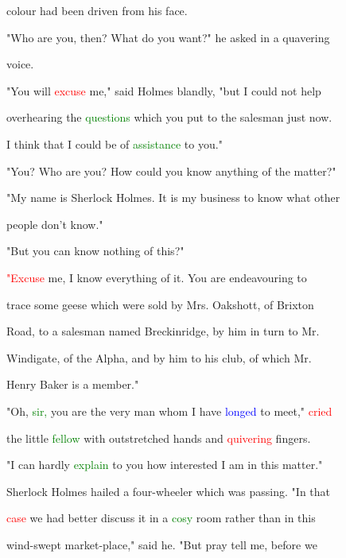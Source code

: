  colour had been driven from his face.



 "Who are you, then? What do you want?" he asked in a quavering

 voice.



 "You will \textcolor{red}{excuse} me," said Holmes blandly, "but I could not help

 overhearing the \textcolor{green}{questions} which you put to the salesman just now.

 I think that I could be of \textcolor{green}{assistance} to you."



 "You? Who are you? How could you know anything of the matter?"



 "My name is Sherlock Holmes. It is my business to know what other

 people don't know."



 "But you can know nothing of this?"



 \textcolor{red}{"Excuse} me, I know everything of it. You are endeavouring to

 trace some geese which were sold by Mrs. Oakshott, of Brixton

 Road, to a salesman named Breckinridge, by him in turn to Mr.

 Windigate, of the Alpha, and by him to his club, of which Mr.

 Henry Baker is a member."



 "Oh, \textcolor{green}{sir,} you are the very man whom I have \textcolor{blue}{longed} to meet," \textcolor{red}{cried}

 the little \textcolor{green}{fellow} with outstretched hands and \textcolor{red}{quivering} fingers.

 "I can hardly \textcolor{green}{explain} to you how \textcolor{BurntOrange}{interested} I am in this matter."



 Sherlock Holmes \textcolor{BurntOrange}{hailed} a four-wheeler which was passing. "In that

 \textcolor{red}{case} we had better discuss it in a \textcolor{green}{cosy} room rather than in this

 wind-swept market-place," said he. "But \textcolor{BurntOrange}{pray} tell me, before we


